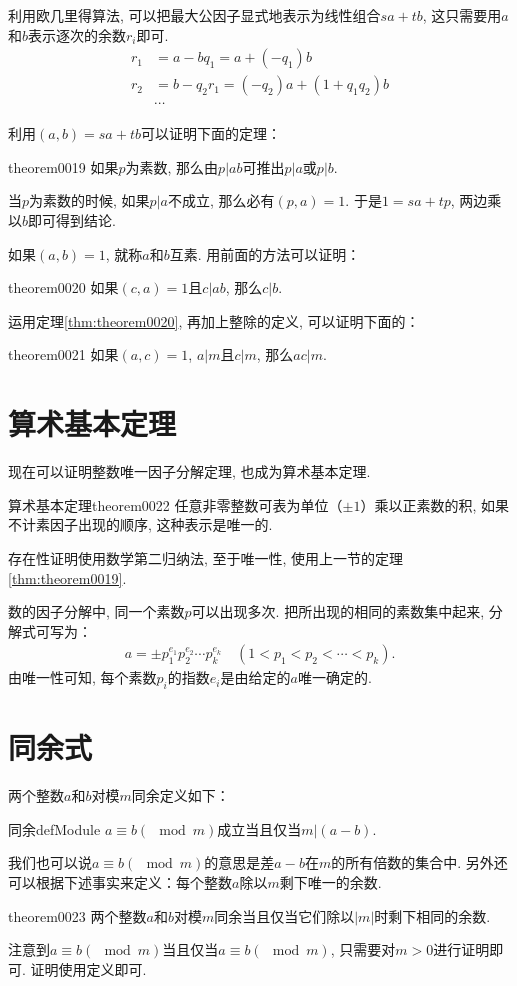 利用欧几里得算法, 可以把最大公因子显式地表示为线性组合$sa+tb$, 这只需要用$a$和$b$表示逐次的余数$r_i$即可. 
\[
\begin{aligned}
r_1 &= a - bq_1 = a + (-q_1)b \\
r_2 &= b - q_2r_1 = (-q_2)a + (1 + q_1q_2)b \\
&\cdots
\end{aligned}
\]

利用$(a, b) = sa+tb$可以证明下面的定理：
\begin{theorem}{}{theorem0019}
如果$p$为素数, 那么由$p|ab$可推出$p|a$或$p|b$. 
\end{theorem}

当$p$为素数的时候, 如果$p|a$不成立, 那么必有$(p, a)=1$. 于是$1 = sa+tp$, 两边乘以$b$即可得到结论. 

如果$(a, b)=1$, 就称$a$和$b$互素. 用前面的方法可以证明：
\begin{theorem}{}{theorem0020}
如果$(c, a)=1$且$c|ab$, 那么$c|b$. 
\end{theorem}

运用定理\ref{thm:theorem0020}, 再加上整除的定义, 可以证明下面的：
\begin{theorem}{}{theorem0021}
如果$(a, c)=1$, $a|m$且$c|m$, 那么$ac|m$. 
\end{theorem}


\section{算术基本定理}\label{section0010108}
现在可以证明整数唯一因子分解定理, 也成为算术基本定理. 
\begin{theorem}{算术基本定理}{theorem0022}
任意非零整数可表为单位（$\pm{}1$）乘以正素数的积, 如果不计素因子出现的顺序, 这种表示是唯一的. 
\end{theorem}

存在性证明使用数学第二归纳法, 至于唯一性, 使用上一节的定理\ref{thm:theorem0019}. 

数的因子分解中, 同一个素数$p$可以出现多次. 把所出现的相同的素数集中起来, 分解式可写为：
\begin{gather}\label{equation0015}
a = \pm{}p_1^{e_1}p_2^{e_2} \cdots p_k^{e_k} \quad (1 < p_1 < p_2 < \cdots < p_k).
\end{gather}
由唯一性可知, 每个素数$p_i$的指数$e_i$是由给定的$a$唯一确定的. 


\section{同余式}\label{section0010109}
两个整数$a$和$b$对模$m$同余定义如下：
\begin{definition}{同余}{defModule}
$a \equiv b (\mod{m})$成立当且仅当$m|(a-b)$. 
\end{definition}
我们也可以说$a \equiv b(\mod{m})$的意思是差$a-b$在$m$的所有倍数的集合中. 另外还可以根据下述事实来定义：每个整数$a$除以$m$剩下唯一的余数. 
\begin{theorem}{}{theorem0023}
两个整数$a$和$b$对模$m$同余当且仅当它们除以$|m|$时剩下相同的余数. 
\end{theorem}
注意到$a \equiv b(\mod{m})$当且仅当$a \equiv b(\mod{m})$, 只需要对$m>0$进行证明即可. 证明使用定义即可. 

